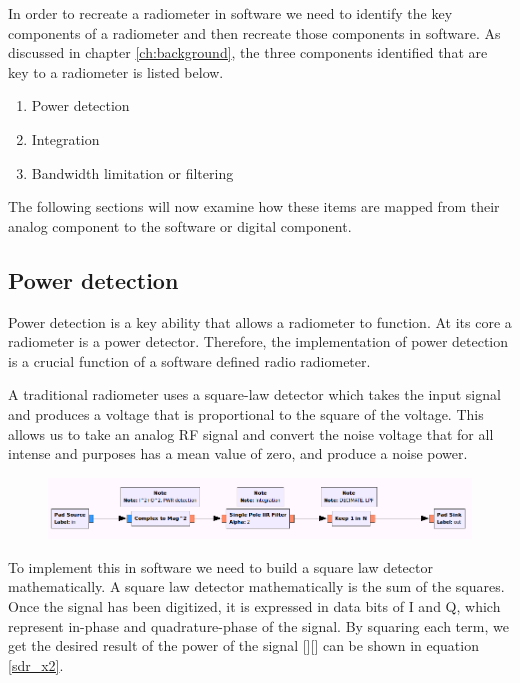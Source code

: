 In order to recreate a radiometer in software we need to identify the key components of a radiometer and then recreate those components in software.  As discussed in chapter \ref{ch:background}, the three components identified that are key to a radiometer is listed below.

\begin{enumerate}
\item Power detection
\item Integration
\item Bandwidth limitation or filtering
\end{enumerate}

The following sections will now examine how these items are mapped from their analog component to the software or digital component.

\subsection{Power detection}

Power detection is a key ability that allows a radiometer to function.  At its core a radiometer is a power detector.  Therefore, the implementation of power detection is a crucial function of a software defined radio radiometer.

A traditional radiometer uses a square-law detector which takes the input signal and produces a voltage that is proportional to the square of the voltage.  This allows us to take an analog RF signal and convert the noise voltage that for all intense and purposes has a mean value of zero, and produce a noise power.

{\begin{figure}[h!tb] 
\centering
\includegraphics[width=17cm]{Images/TPR_grc.png}
\label{square_block}
\end{figure}
}

To implement this in software we need to build a square law detector mathematically.   A square law detector mathematically is the sum of the squares.  Once the signal has been digitized, it is expressed in data bits of I and Q, which represent in-phase and quadrature-phase of the signal.  By squaring each term, we get the desired result of the power of the signal [\cite{Sarijari}][\cite{Rashid}] can be shown in equation \ref{sdr_x2}.

